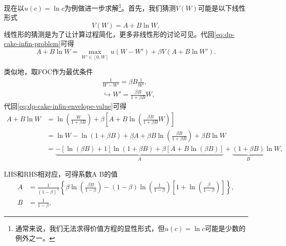现在以$u(c) = \ln c$为例做进一步求解\footnote{通常来说，我们无法求得价值方程的显性形式，但$u(c) = \ln c$可能是少数的例外之一。}。首先，我们猜测$V(W)$可能是以下线性形式
\begin{equation}
  \label{eq:dp-cake-infin-envelope-value-guess}
  V(W) = A + B \ln W,
\end{equation}
线性形的猜测是为了让计算过程简化，更多非线性形的讨论可见\cite{Hansen:2004va}。代回\eqref{eq:dp-cake-infin-problem}可得
\begin{equation}
  \label{eq:dp-cake-infin-envelope-value}
  A + B \ln W = \max_{W' \in \left[ 0, W \right]}
  u \left( W - W' \right) + \beta V \left( A + B \ln W' \right).
\end{equation}

类似地，取FOC作为最优条件
\begin{equation*}
  \begin{split}
    & \frac{1}{W - W'} = \beta B \frac{1}{W'}, \\
    & \hookrightarrow W' = \frac{\beta B}{1 + \beta B} W,
  \end{split}
\end{equation*}
代回\eqref{eq:dp-cake-infin-envelope-value}可得
\begin{equation}
  \label{eq:dp-cake-infin-envelope-ABvalue}
  \begin{split}
  A + B \ln W & =
  \ln \left( \frac{W}{1 + \beta B} \right)
  + \beta \left[
  A + B \ln \left( \frac{\beta B}{1 + \beta B} W \right)
  \right] \\
  & = \ln W - \ln \left(1 + \beta B \right) + \beta A + \beta B \ln \left( \frac{\beta B}{1 + \beta B} \right) + \beta B \ln W \\
  & = \underbrace{
  - \left[ \ln \left( \beta B \right) + 1 \right] \ln \left( 1 + \beta B \right)
  + \beta \left[
  A + B \ln \left( \beta B \right)
  \right]
  }_{A}
  +
  \underbrace{
  \left( 1 + \beta B \right)
  }_{B}
  \ln W,
  \end{split}
\end{equation}

LHS和RHS相对应，可得系数A B的值
\begin{equation*}
  \begin{split}
    A & = \frac{1}{\left( 1 - \beta \right)^{2}}
    \left\{
    \beta \ln \left( \frac{\beta B}{1 - \beta} \right)
    - \left( 1 - \beta \right)
    \ln \left( \frac{1}{1- \beta } \right)
    \left[ 1 + \ln \left( \frac{\beta}{1 - \beta} \right) \right]
    \right\}, \\
    B & = \frac{1}{1 - \beta},
  \end{split}
\end{equation*}

